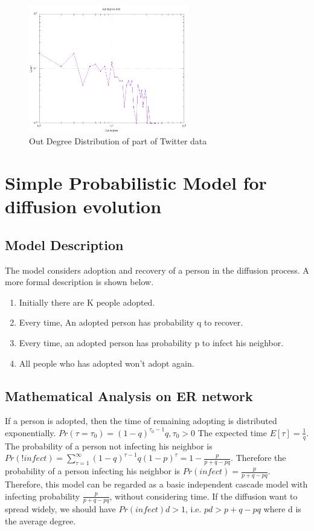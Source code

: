 \documentclass{article}
\begin{document}
\begin{figure}[H]
\centering
\includegraphics[width=7cm]{out-degree-distr.png}
\caption{Out Degree Distribution of part of Twitter data}
\end{figure}

\section{Simple Probabilistic Model for diffusion evolution}
\subsection{Model Description}
The model considers adoption and recovery of a person in the diffusion process. A more formal description is shown below.
\begin{enumerate}
\item Initially there are K people adopted.
\item Every time, An adopted person has probability q to recover.
\item Every time, an adopted person has probability p to infect his neighbor.
\item All people who has adopted won't adopt again.
\end{enumerate}
\subsection{Mathematical Analysis on ER network}
If a person is adopted, then the time of remaining adopting is distributed exponentially. $Pr(\tau={\tau}_0)=(1-q)^{{\tau}_0-1}q,{\tau}_0>0$ The expected time $E[\tau]=\frac{1}{q}$. The probability of a person not infecting his neighbor is $Pr(!infect)=\sum_{\tau=1}^{\infty}{(1-q)}^{\tau-1}q{(1-p)}^{\tau}=1-\frac{p}{p+q-pq}$. Therefore the probability of a person infecting his neighbor is $Pr(infect)=\frac{p}{p+q-pq}$. Therefore, this model can be regarded as a basic independent cascade model with infecting probability $\frac{p}{p+q-pq}$, without considering time. If the diffusion want to spread widely, we should have $Pr(infect)d>1$, i.e. $pd>p+q-pq$ where d is the average degree.
\end{document}
